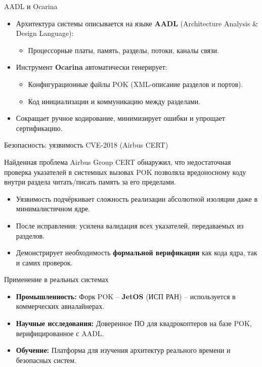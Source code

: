 \begin{frame}{AADL и Ocarina}
    \begin{itemize}
        \item Архитектура системы описывается на языке \textbf{AADL} (Architecture Analysis \& Design Language):
        \begin{itemize}
            \item Процессорные платы, память, разделы, потоки, каналы связи.
        \end{itemize}
        \item Инструмент \textbf{Ocarina} автоматически генерирует:
        \begin{itemize}
            \item Конфигурационные файлы POK (XML-описание разделов и портов).
            \item Код инициализации и коммуникацию между разделами.
        \end{itemize}
        \item Сокращает ручное кодирование, минимизирует ошибки и упрощает сертификацию.
    \end{itemize}
\end{frame}

\begin{frame}{Безопасность: уязвимость CVE-2018 (Airbus CERT)}
    \begin{alertblock}{Найденная проблема}
        Airbus Group CERT обнаружил, что недостаточная проверка указателей в системных вызовах POK позволяла вредоносному коду внутри раздела читать/писать память за его пределами.
    \end{alertblock}
    \begin{itemize}
        \item Уязвимость подчёркивает сложность реализации абсолютной изоляции даже в минималистичном ядре.
        \item После исправления: усилена валидация всех указателей, передаваемых из разделов.
        \item Демонстрирует необходимость \textbf{формальной верификации} как кода ядра, так и самих проверок.
    \end{itemize}
    \begin{center}
    \end{center}
\end{frame}

\begin{frame}{Применение в реальных системах}
    \begin{itemize}
        \item \textbf{Промышленность:} Форк POK -- \textbf{JetOS} (ИСП РАН) -- используется в коммерческих авиалайнерах.
        \item \textbf{Научные исследования:} Доверенное ПО для квадрокоптеров на базе POK, верифицированное с AADL.
        \item \textbf{Обучение:} Платформа для изучения архитектур реального времени и безопасных систем.
    \end{itemize}
\end{frame}

